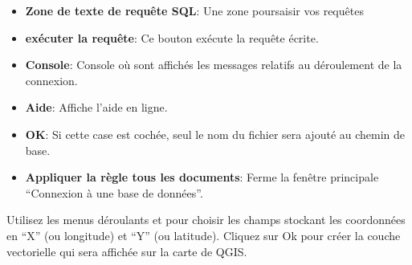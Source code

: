 \begin{itemize}
\item \textbf{Zone de texte de requête SQL}: Une zone poursaisir vos requêtes
\item \textbf{exécuter la requête}: Ce bouton exécute la requête écrite.
\item \textbf{Console}: Console où sont affichés les messages relatifs au déroulement de la connexion.
\item \textbf{Aide}: Affiche l'aide en ligne.
\item \textbf{OK}: Si cette case est cochée, seul le nom du fichier sera ajouté au chemin de base.
\item \textbf{Appliquer la règle tous les documents}: Ferme la fenêtre principale ``Connexion à une base de données''.
\end{itemize}


Utilisez les menus déroulants  et  pour choisir les champs stockant les coordonnées en ``X'' (ou longitude) et ``Y'' (ou latitude). Cliquez sur Ok pour créer la couche vectorielle qui sera affichée sur la carte de QGIS.


